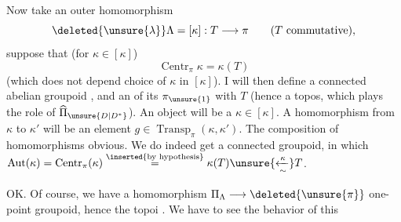 Now take an  outer homomorphism
\[
\deleted{\unsure{\lambda}}\Lambda=[\kappa]:T\longrightarrow\pi
\qquad (T\text{ commutative}),
\]
suppose that (for \(\kappa\in[\kappa]\))
\[
\operatorname{Centr}_\pi\kappa=\kappa(T)
\]
(which does not depend  choice of \(\kappa\) in
\([\kappa]\)). I will then define a
 connected abelian groupoid \inserted{\(\Pi_\Lambda\)}, and an
 of its \(\pi_{\unsure{1}}\) with \(T\) 
(hence a topos, which plays the role of
\(\widehat{\Pi}_{\unsure{D|D^*}}\)). An object will be a \(\kappa\in[\kappa]\).
A homomorphism from \(\kappa\) to \(\kappa'\) will be an
element \(g\in\operatorname{Transp}_\pi(\kappa,\kappa')\). 
The composition of homomorphisms obvious. We
do indeed get a connected groupoid, in
which \(\operatorname{Aut}(\kappa)=\operatorname{Centr}_\pi(\kappa)\overset{\inserted{\text{by hypothesis}}}{=}\kappa(T)\unsure{\xleftarrow[\sim]{\kappa}}T\).

OK. Of course, we have a homomorphism
\(\Pi_\Lambda\longrightarrow\deleted{\unsure{\pi}}\) one-point groupoid, hence
 the  topoi  .
We have to see the behavior of this

